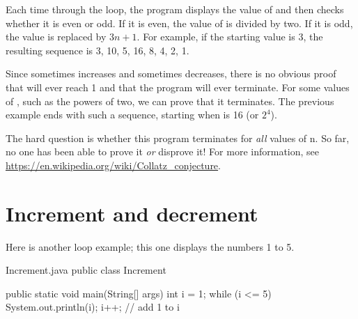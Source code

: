 
Each time through the loop, the program displays the value of  and then checks whether it is even or odd.
If it is even, the value of  is divided by two.
If it is odd, the value is replaced by $3n+1$.
For example, if the starting value is 3, the resulting sequence is 3, 10, 5, 16, 8, 4, 2, 1.

Since  sometimes increases and sometimes decreases, there is no obvious proof that  will ever reach 1 and that the program will ever terminate.
For some values of , such as the powers of two, we can prove that it terminates.
The previous example ends with such a sequence, starting when  is 16 (or $2^4$).

The hard question is whether this program terminates for {\em all} values of n.
So far, no one has been able to prove it {\em or} disprove it!
For more information, see \url{https://en.wikipedia.org/wiki/Collatz_conjecture}.


\section{Increment and decrement}

Here is another  loop example; this one displays the numbers 1 to 5.

\begin{trinket} [220] {Increment.java}
public class Increment {

    public static void main(String[] args) {
       int i = 1;
       while (i <= 5) {
          System.out.println(i);
          i++;  // add 1 to i
       }
    }
}
\end{trinket}

